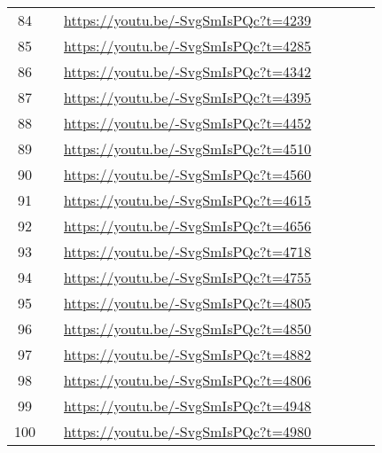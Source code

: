 \begin{longtable*}[]{ccp{2.0cm} p{5.0cm} p{5.0cm} p{5.0cm} p{5.0cm}}
84 &  & \url{https://youtu.be/-SvgSmIsPQc?t=4239} \\
85 &  & \url{https://youtu.be/-SvgSmIsPQc?t=4285} \\
86 &  & \url{https://youtu.be/-SvgSmIsPQc?t=4342} \\
87 &  & \url{https://youtu.be/-SvgSmIsPQc?t=4395} \\
88 &  & \url{https://youtu.be/-SvgSmIsPQc?t=4452} \\
89 &  & \url{https://youtu.be/-SvgSmIsPQc?t=4510} \\
90 &  & \url{https://youtu.be/-SvgSmIsPQc?t=4560} \\
91 &  & \url{https://youtu.be/-SvgSmIsPQc?t=4615} \\
92 &  & \url{https://youtu.be/-SvgSmIsPQc?t=4656} \\
93 &  & \url{https://youtu.be/-SvgSmIsPQc?t=4718} \\
94 &  & \url{https://youtu.be/-SvgSmIsPQc?t=4755} \\
95 &  & \url{https://youtu.be/-SvgSmIsPQc?t=4805} \\
96 &  & \url{https://youtu.be/-SvgSmIsPQc?t=4850} \\
97 &  & \url{https://youtu.be/-SvgSmIsPQc?t=4882} \\
98 &  & \url{https://youtu.be/-SvgSmIsPQc?t=4806} \\
99 &  & \url{https://youtu.be/-SvgSmIsPQc?t=4948} \\
100 &  & \url{https://youtu.be/-SvgSmIsPQc?t=4980} \\
\end{longtable*}
